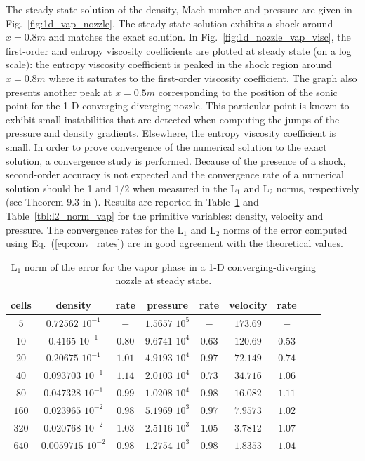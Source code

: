 \documentclass[preprint,10pt]{elsarticle}
\newcommand{\eqt}[1]{Eq.~(\ref{#1})}                     %
\newcommand{\fig}[1]{Fig.~\ref{#1}}                      %
\newcommand{\tbl}[1]{Table~\ref{#1}}                     %
\begin{document}
%
The steady-state solution of the density, Mach number and pressure are given in \fig{fig:1d_vap_nozzle}. 
The steady-state solution exhibits a shock around $x=0.8m$ and matches the exact solution. In \fig{fig:1d_nozzle_vap_visc}, 
the first-order and entropy viscosity coefficients are plotted at steady state (on a log scale): the entropy viscosity 
coefficient is peaked in the shock region around $x=0.8m$ where it saturates to the first-order viscosity 
coefficient. The graph also presents another peak at $x=0.5m$  corresponding to the position of the sonic point for the 
1-D converging-diverging nozzle. This particular point is known to exhibit small instabilities that are detected when 
computing the jumps of the pressure and density gradients. Elsewhere, the entropy  viscosity coefficient is small. 
In order to prove convergence of the numerical solution to the exact solution, a convergence study is performed. Because 
of the presence of a shock, second-order accuracy is not expected and the convergence rate of a numerical solution 
should be 1 and $1/2$ when measured in the L$_1$ and L$_2$ norms, respectively (see Theorem 9.3 in \cite{convergence_book}). 
Results are reported in \tbl{tbl:l1_norm_vap} and \tbl{tbl:l2_norm_vap} for the primitive variables: density, 
velocity and pressure. The convergence rates for the L$_1$ and L$_2$ norms of the error computed using \eqt{eq:conv_rates} 
are in good agreement with the theoretical values.
%
\begin{table}[!htbp]
\begin{center}
 \caption{\label{tbl:l1_norm_vap} L$_1$ norm of the error for the vapor phase in a 1-D converging-diverging nozzle at steady state.}
 \begin{tabular}{|c|c|c|c|c|c|c|c|c|}
 \hline
cells & density              & rate      & pressure          & rate      & velocity & rate      \\ \hline
$5$  & $0.72562$   $10^{-1}$ & $-$       & $1.5657$ $10^{5}$ & $-$       & $173.69$ & $-$       \\ \hline
$10$ & $0.4165$    $10^{-1}$ & $0.80$ & $9.6741$ $10^{4}$ & $0.63$ & $120.69$ & $0.53$ \\ \hline
$20$ & $0.20675$   $10^{-1}$ & $1.01$  & $4.9193$ $10^{4}$ & $0.97$ & $72.149$ & $0.74$ \\ \hline
$40$ & $0.093703$  $10^{-1}$ & $1.14$  & $2.0103$ $10^{4}$ & $0.73$ & $34.716$ & $1.06$  \\ \hline
$80$ & $0.047328$  $10^{-1}$ & $0.99$  & $1.0208$ $10^{4}$ & $0.98$  & $16.082$ & $1.11$  \\ \hline
$160$& $0.023965$  $10^{-2}$ & $0.98$  & $5.1969$ $10^{3}$ & $0.97$  & $7.9573$ & $1.02$  \\ \hline
$320$& $0.020768$  $10^{-2}$ & $1.03$  & $2.5116$ $10^{3}$ & $1.05$  & $3.7812$ & $1.07$  \\ \hline
$640$& $0.0059715$ $10^{-2}$ & $0.98$  & $1.2754$ $10^{3}$ & $0.98$  & $1.8353$ & $1.04$  \\ \hline
\end{tabular}
\end{center}
\nonumber
\end{table}
\end{document}
